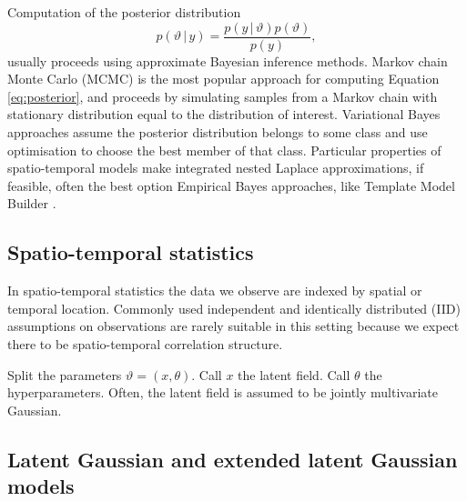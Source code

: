 \documentclass[a4paper, nobind]{templates/ociamthesis}
\begin{document}
Computation of the posterior distribution
\begin{equation}
p(\vartheta \, | \, y) = \frac{p(y \, | \, \vartheta) p(\vartheta)}{p(y)}, \label{eq:posterior}
\end{equation}
usually proceeds using approximate Bayesian inference methods.
Markov chain Monte Carlo (MCMC) is the most popular approach for computing Equation \ref{eq:posterior}, and proceeds by simulating samples from a Markov chain with stationary distribution equal to the distribution of interest.
Variational Bayes approaches assume the posterior distribution belongs to some class and use optimisation to choose the best member of that class.
Particular properties of spatio-temporal models make integrated nested Laplace approximations, if feasible, often the best option
Empirical Bayes approaches, like Template Model Builder \autocite{osgoodzimmerman2021statistical}.

\hypertarget{spatio-temporal-statistics}{%
\subsection{Spatio-temporal statistics}\label{spatio-temporal-statistics}}

In spatio-temporal statistics the data we observe are indexed by spatial or temporal location.
Commonly used independent and identically distributed (IID) assumptions on observations are rarely suitable in this setting because we expect there to be spatio-temporal correlation structure.

Split the parameters \(\vartheta = (x, \theta)\).
Call \(x\) the latent field.
Call \(\theta\) the hyperparameters.
Often, the latent field is assumed to be jointly multivariate Gaussian.

\hypertarget{latent-gaussian-and-extended-latent-gaussian-models}{%
\subsection{Latent Gaussian and extended latent Gaussian models}\label{latent-gaussian-and-extended-latent-gaussian-models}}
\end{document}

